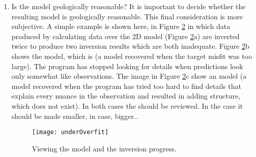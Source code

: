 \begin{enumerate}
The progress of the inversion (or the convergence curve) during its iterations should also be checked (Figure \ref{fig:convGUI}). In the model viewing window, the algorithm's progress can be displayed graphically by selecting the "Curves" toolbar button in the  menu. The resulting graph shows how the values of misfit and model norm varied at each iteration. ( is the value of the model objective function - this is what we are trying to . The algorithm is programmed to add structure gradually in order to find a model that explains the data - i.e. it works on reducing the misfit value (blue curve) until the target misfit is reached. Then it must try to minimize the model norm without changing misfit. Thus, you should see a slight drop in the model norm value (red curve) until no more adjustments can be made to improve the situation.
%
\begin{figure}
\centering
\texttt{[image: convGUI]}
\caption{Viewing the model and the inversion progress.}
\label{fig:convGUI}
\end{figure}
%
\item Is the model geologically reasonable? It is important to decide whether the resulting model is geologically reasonable. This final consideration is more subjective. A simple example is shown here, in Figure \ref{fig:fitFig} in which data produced by calculating data over the  2D model (Figure \ref{fig:fitFig}a) are inverted twice to produce two inversion results which are both inadequate. Figure \ref{fig:fitFig}b shows the model, which is  (a model recovered when the target misfit was too large). The program has stopped looking for details when predictions look only somewhat like observations. The image in Figure \ref{fig:fitFig}c show an  model (a model recovered when the program has tried too hard to find details that explain every nuance in the observation and resulted in adding structure, which does not exist). In both cases the  should be reviewed. In the  case it should be made smaller, in  case, bigger..
%
\begin{figure}
\centering
\texttt{[image: underOverfit]}
\caption{Viewing the model and the inversion progress.}
\label{fig:fitFig}
\end{figure}
%
\end{enumerate}

